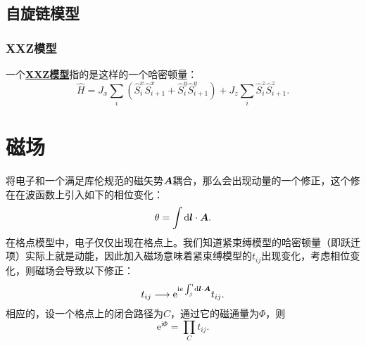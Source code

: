 \documentclass[hyperref, UTF8, a4paper]{ctexart}
\newcommand*{\ii}{\mathrm{i}}
\newcommand*{\ee}{\mathrm{e}}
\newcommand*{\concept}[1]{\underline{\textbf{#1}}}
\begin{document}
\subsection{自旋链模型}

\subsubsection{XXZ模型}

一个\concept{XXZ模型}指的是这样的一个哈密顿量：
\begin{equation}
    \hat{H} = J_x \sum_i (\hat{S}_{i}^x \hat{S}_{i+1}^x + \hat{S}_{i}^y \hat{S}_{i+1}^y) + J_z \sum_{i} \hat{S}_i^z \hat{S}_{i+1}^z.
\end{equation}

\section{磁场}

将电子和一个满足库伦规范的磁矢势$\vb*{A}$耦合，那么会出现动量的一个修正，这个修在在波函数上引入如下的相位变化：
\begin{equation}
    \theta = \int \dd{\vb*{l}} \cdot \vb*{A}.
\end{equation}
在格点模型中，电子仅仅出现在格点上。我们知道紧束缚模型的哈密顿量（即跃迁项）实际上就是动能，因此加入磁场意味着紧束缚模型的$t_{ij}$出现变化，考虑相位变化，则磁场会导致以下修正：
\begin{equation}
    t_{ij} \longrightarrow \ee^{\ii e \int_j^i \dd{\vb*{l}} \cdot \vb*{A} } t_{ij}.
\end{equation}
相应的，设一个格点上的闭合路径为$C$，通过它的磁通量为$\Phi$，则
\begin{equation}
    \ee^{\ii \Phi} = \prod_{C} t_{ij}.
\end{equation}
\end{document}
